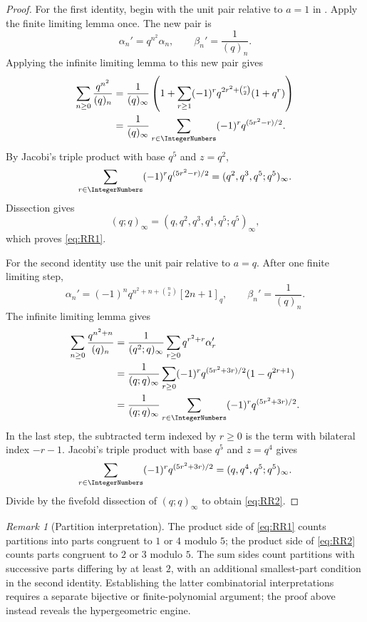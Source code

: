 \documentclass[11pt,a4paper,oneside,openany]{book}
\theoremstyle{definition}
\theoremstyle{remark}
\newtheorem{remark}[remark]{Remark}
\begin{document}
\begin{proof}
For the first identity, begin with the unit pair relative to $a=1$ in .  Apply the finite limiting lemma once.  The new pair is
\[
 \alpha_n'=q^{n^2}\alpha_n,
 \qquad
 \beta_n'=\frac1{(q)_n}.
\]  Applying the infinite limiting lemma to this new pair gives
\begin{align*}
 \sum_{n\ge0}\frac{q^{n^2}}{(q)_n}
 &=\frac1{(q)_\infty}
 \left(1+\sum_{r\ge1}(-1)^r
 q^{2r^2+\binom r2}(1+q^r)\right)\\
 &=\frac1{(q)_\infty}
 \sum_{r\in\IntegerNumbers}(-1)^rq^{(5r^2-r)/2}.
\end{align*}
By Jacobi's triple product with base $q^5$ and $z=q^2$,
\[
 \sum_{r\in\IntegerNumbers}(-1)^rq^{(5r^2-r)/2}
 =(q^2,q^3,q^5;q^5)_\infty.
\]
Dissection gives
\[
 (q;q)_\infty=(q,q^2,q^3,q^4,q^5;q^5)_\infty,
\]
which proves \eqref{eq:RR1}.

For the second identity use the unit pair relative to $a=q$.  After one finite limiting step,
\[
 \alpha_n'=(-1)^nq^{n^2+n+\binom n2}[2n+1]_q,
 \qquad
 \beta_n'=\frac1{(q)_n}.
\]
The infinite limiting lemma gives
\begin{align*}
 \sum_{n\ge0}\frac{q^{n^2+n}}{(q)_n}
 &=\frac1{(q^2;q)_\infty}
 \sum_{r\ge0}q^{r^2+r}\alpha_r'\\
 &=\frac1{(q;q)_\infty}
 \sum_{r\ge0}(-1)^rq^{(5r^2+3r)/2}(1-q^{2r+1})\\
 &=\frac1{(q;q)_\infty}
 \sum_{r\in\IntegerNumbers}(-1)^rq^{(5r^2+3r)/2}.
\end{align*}
In the last step, the subtracted term indexed by $r\ge0$ is the term with bilateral index $-r-1$.  Jacobi's triple product with base $q^5$ and $z=q^4$ gives
\[
 \sum_{r\in\IntegerNumbers}(-1)^rq^{(5r^2+3r)/2}
 =(q,q^4,q^5;q^5)_\infty.
\]
Divide by the fivefold dissection of $(q;q)_\infty$ to obtain \eqref{eq:RR2}.
\end{proof}

\begin{remark}[Partition interpretation]
The product side of \eqref{eq:RR1} counts partitions into parts congruent to $1$ or $4$ modulo $5$; the product side of \eqref{eq:RR2} counts parts congruent to $2$ or $3$ modulo $5$.  The sum sides count partitions with successive parts differing by at least $2$, with an additional smallest-part condition in the second identity.  Establishing the latter combinatorial interpretations requires a separate bijective or finite-polynomial argument; the proof above instead reveals the hypergeometric engine.
\end{remark}
\end{document}
